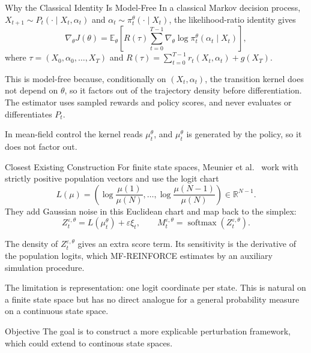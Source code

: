 \documentclass[9pt]{beamer}
\def\E{{\mathbb E}}
\def\R{{\mathbb R}}
\begin{document}
\begin{frame}{Why the Classical Identity Is Model-Free}
\small
In a classical Markov decision process, $X_{t+1}\sim P_t(\cdot\mid X_t,\alpha_t)$ and $\alpha_t\sim\pi_t^\theta(\cdot\mid X_t)$, the likelihood-ratio identity gives
\[
  \nabla_\theta J(\theta)
  =
  \E_\theta\!\left[
    R(\tau)
    \sum_{t=0}^{T-1}
    \nabla_\theta\log\pi_t^\theta(\alpha_t\mid X_t)
  \right],
\]
where $\tau=(X_0,\alpha_0,\ldots,X_T)$ and $R(\tau)=\sum_{t=0}^{T-1}r_t(X_t,\alpha_t)+g(X_T)$.

\vspace{0.2cm}
This is model-free because, conditionally on $(X_t,\alpha_t)$, the transition kernel does not depend on $\theta$, so it factors out of the trajectory density before differentiation. The estimator uses sampled rewards and policy scores, and never evaluates or differentiates $P_t$.

\vspace{0.3cm}
In mean-field control the kernel reads $\mu_t^\theta$, and $\mu_t^\theta$ is generated by the policy, so it does not factor out.

\end{frame}

\begin{frame}{Closest Existing Construction}
\small
For finite state spaces, Meunier et al.~\cite{meunier2026model} work with strictly positive population vectors and use the logit chart
\[
  L(\mu)=\left(\log\frac{\mu(1)}{\mu(N)},\ldots,
  \log\frac{\mu(N-1)}{\mu(N)}\right)\in\R^{N-1}.
\]
They add Gaussian noise in this Euclidean chart and map back to the simplex:
\[
  Z_t^{\varepsilon,\theta}=L(\mu_t^\theta)+\varepsilon \xi_t,
  \qquad
  M_t^{\varepsilon,\theta}=\operatorname{softmax}(Z_t^{\varepsilon,\theta}).
\]

\vspace{0.15cm}
The density of $Z_t^{\varepsilon,\theta}$ gives an extra score term. Its sensitivity is the derivative of the population logits, which MF-REINFORCE estimates by an auxiliary simulation procedure.

\vspace{0.25cm}
The limitation is representation: one logit coordinate per state. This is natural on a finite state space but has no direct analogue for a general probability measure on a continuous state space.

\vspace{0.15cm}
\begin{block}{Objective}
  The goal is to construct a more explicable perturbation framework, which could extend to continous state spaces.
\end{block}
\end{frame}
\end{document}
